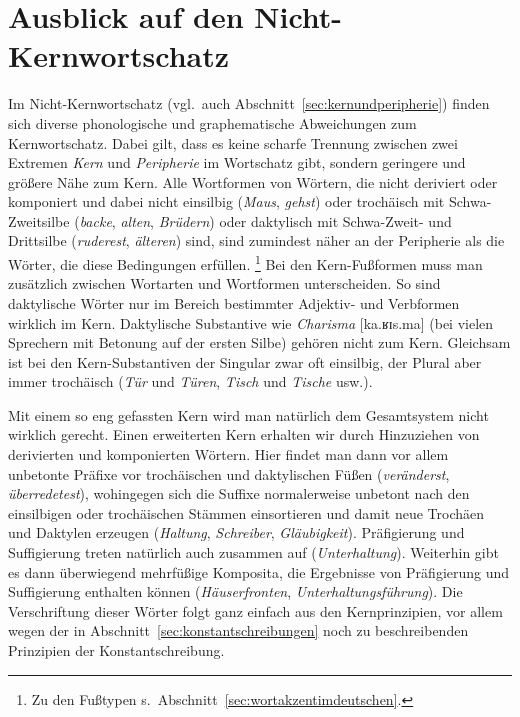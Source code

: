 \section{Ausblick auf den Nicht-Kernwortschatz}
\label{sec:ausblickaufdennichtkernwortschatz}


Im Nicht-Kernwortschatz (vgl.\ auch Abschnitt~\ref{sec:kernundperipherie}) finden sich diverse phonologische und graphematische Abweichungen zum Kernwortschatz.
Dabei gilt, dass es keine scharfe Trennung zwischen zwei Extremen \textit{Kern} und \textit{Peripherie} im Wortschatz gibt, sondern geringere und größere Nähe zum Kern.
Alle Wortformen von Wörtern, die nicht deriviert oder komponiert und dabei nicht einsilbig (\textit{Maus}, \textit{gehst}) oder trochäisch mit Schwa-Zweitsilbe (\textit{backe}, \textit{alten}, \textit{Brüdern}) oder daktylisch mit Schwa-Zweit- und Drittsilbe (\textit{ruderest}, \textit{älteren}) sind, sind zumindest näher an der Peripherie als die Wörter, die diese Bedingungen erfüllen.%
\footnote{Zu den Fußtypen s.\ Abschnitt~\ref{sec:wortakzentimdeutschen}.}
Bei den Kern-Fußformen muss man zusätzlich zwischen Wortarten und Wortformen unterscheiden.
So sind \zB daktylische Wörter nur im Bereich bestimmter Adjektiv- und Verbformen wirklich im Kern.
Daktylische Substantive wie \textit{Charisma} [ka.ʁɪs.ma] (bei vielen Sprechern mit Betonung auf der ersten Silbe) gehören nicht zum Kern.
Gleichsam ist bei den Kern-Substantiven der Singular zwar oft einsilbig, der Plural aber immer trochäisch (\textit{Tür} und \textit{Türen}, \textit{Tisch} und \textit{Tische} usw.).

Mit einem so eng gefassten Kern wird man natürlich dem Gesamtsystem nicht wirklich gerecht.
Einen erweiterten Kern erhalten wir durch Hinzuziehen von derivierten und komponierten Wörtern.
Hier findet man dann vor allem unbetonte Präfixe vor trochäischen und daktylischen Füßen (\textit{veränderst}, \textit{überredetest}), wohingegen sich die Suffixe normalerweise unbetont nach den einsilbigen oder trochäischen Stämmen einsortieren und damit neue Trochäen und Daktylen erzeugen (\textit{Haltung}, \textit{Schreiber}, \textit{Gläubigkeit}).
Präfigierung und Suffigierung treten natürlich auch zusammen auf (\textit{Unterhaltung}).
Weiterhin gibt es dann überwiegend mehrfüßige Komposita, die Ergebnisse von Präfigierung und Suffigierung enthalten können (\textit{Häuserfronten}, \textit{Unterhaltungsführung}).
Die Verschriftung dieser Wörter folgt ganz einfach aus den Kernprinzipien, vor allem wegen der in Abschnitt~\ref{sec:konstantschreibungen} noch zu beschreibenden Prinzipien der Konstantschreibung.

